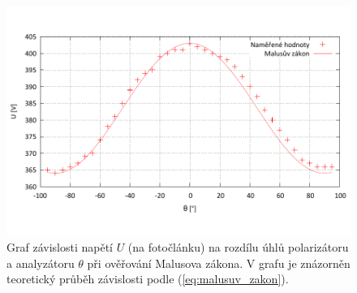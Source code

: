 \documentclass[english]{article}
\begin{document}
		\begin{figure}[h!]
		\begin{center}
		    \vspace*{-1cm}
			\includegraphics[width=\linewidth]{../gnuplot/2_malus.pdf}
		    \vspace*{-2cm}
			\caption{Graf závislosti napětí $U$ (na fotočlánku) na rozdílu úhlů polarizátoru a analyzátoru $\theta$ při ověřování Malusova zákona. V grafu je znázorněn teoretický průběh závislosti podle (\ref{eq:malusuv_zakon}).}
			\label{fig:g_malusuv_zakon}
		\end{center}
		\end{figure}		
		
\end{document}
